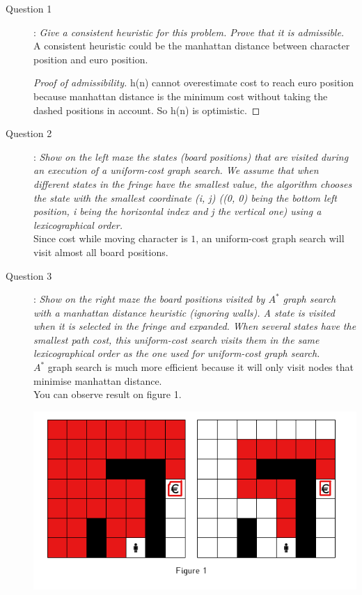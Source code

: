 \begin{description}
\item[Question 1]: \textit{Give a consistent heuristic for this problem. Prove that it is admissible.}\\
A consistent heuristic could be the manhattan distance between character position and euro position.
\begin{proof}[Proof of admissibility]
h(n) cannot overestimate cost to reach euro position because manhattan distance is the minimum cost without taking the dashed positions in account. So h(n) is optimistic.
\end{proof}


\item[Question 2]: \textit{Show on the left maze the states (board positions) that are visited during an execution of a uniform-cost graph search. We assume that when different states in the fringe have the smallest value, the algorithm chooses the state with the smallest coordinate (i, j) ((0, 0) being the bottom left position, i being the horizontal index and j the vertical one) using a lexicographical order.} \\
Since cost while moving character is $1$, an uniform-cost graph search will visit almost all board positions.\\



\item[Question 3]: \textit{Show on the right maze the board positions visited by $A^*$ graph search with
a manhattan distance heuristic (ignoring walls). A state is visited when it is
selected in the fringe and expanded. When several states have the smallest
path cost, this uniform-cost search visits them in the same lexicographical order
as the one used for uniform-cost graph search. }\\
$A^\ast$ graph search is much more efficient because it will only visit nodes that minimise manhattan distance. \\

You can observe result on figure 1.

\includegraphics[scale=0.8]{question2.png}

\end{description}